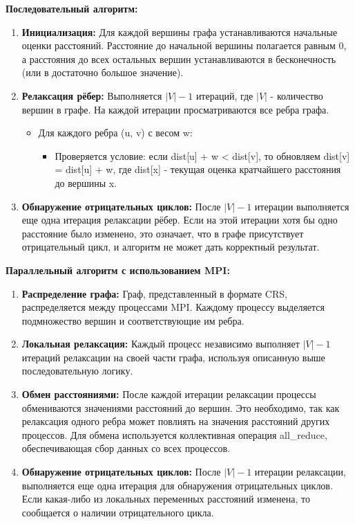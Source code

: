 \documentclass[a4paper, 14pt]{article}
\begin{document}
\textbf{Последовательный алгоритм:}
\vspace{-1em}
\begin{enumerate}
    \item \textbf{Инициализация:} Для каждой вершины графа устанавливаются начальные оценки расстояний. Расстояние до начальной вершины полагается равным 0, а расстояния до всех остальных вершин устанавливаются в бесконечность (или в достаточно большое значение).
    \item \textbf{Релаксация рёбер:} Выполняется $|V|-1$ итераций, где $|V|$ - количество вершин в графе. На каждой итерации просматриваются все ребра графа.
        \begin{itemize}
            \item Для каждого ребра (u, v) с весом w:
                \begin{itemize}
                    \item Проверяется условие: если dist[u] + w < dist[v], то обновляем dist[v] = dist[u] + w, где dist[x] - текущая оценка кратчайшего расстояния до вершины x.
                \end{itemize}
        \end{itemize}
    \item \textbf{Обнаружение отрицательных циклов:} После $|V|-1$ итерации выполняется еще одна итерация релаксации рёбер. Если на этой итерации хотя бы одно расстояние было изменено, это означает, что в графе присутствует отрицательный цикл, и алгоритм не может дать корректный результат.
\end{enumerate}

\textbf{Параллельный алгоритм с использованием MPI:}
\vspace{-1em}
\begin{enumerate}
    \item \textbf{Распределение графа:} Граф, представленный в формате CRS, распределяется между процессами MPI. Каждому процессу выделяется подмножество вершин и соответствующие им ребра.
    \item \textbf{Локальная релаксация:} Каждый процесс независимо выполняет $|V|-1$ итераций релаксации на своей части графа, используя описанную выше последовательную логику.
    \item \textbf{Обмен расстояниями:} После каждой итерации релаксации процессы обмениваются значениями расстояний до вершин. Это необходимо, так как релаксация одного ребра может повлиять на значения расстояний других процессов. Для обмена используется коллективная операция all\_reduce, обеспечивающая сбор данных со всех процессов.
     \item \textbf{Обнаружение отрицательных циклов:} После $|V|-1$ итерации релаксации, выполняется еще одна итерация для обнаружения отрицательных циклов. Если какая-либо из локальных переменных расстояний изменена, то сообщается о наличии отрицательного цикла.
\end{enumerate}
\end{document}
